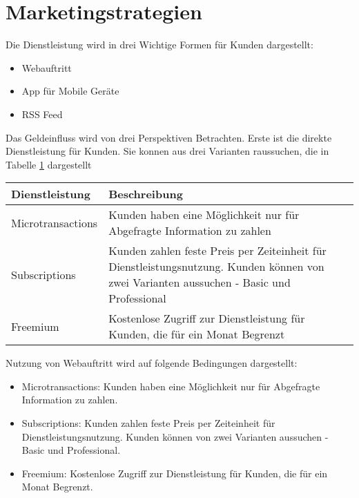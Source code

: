 \documentclass[12pt, a4paper]{article} %
\begin{document}
\newpage


\section{Marketingstrategien}

Die Dienstleistung wird in drei Wichtige Formen für Kunden dargestellt:
\begin{itemize}
\item Webauftritt
\item App für Mobile Geräte
\item RSS Feed
\end{itemize}

Das Geldeinfluss wird von drei Perspektiven Betrachten. Erste ist die direkte Dienstleistung für Kunden. Sie konnen aus drei Varianten raussuchen, die in Tabelle \ref{tab:kunden} dargestellt

\begin{table}[h]
  \centering
  \begin{tabular}{|l|l|}\hline
  Dienstleistung & Beschreibung \\ \hline
  Microtransactions & Kunden haben eine Möglichkeit nur für Abgefragte Information zu zahlen \\ \hline
  Subscriptions & Kunden zahlen feste Preis per Zeiteinheit für Dienstleistungsnutzung. Kunden können von zwei Varianten aussuchen - Basic und Professional \\ \hline
  Freemium & Kostenlose Zugriff zur Dienstleistung für Kunden, die für ein Monat Begrenzt \\ \hline
  \end{tabular}
  \label{tab:kunden}
\end{table}  

Nutzung von Webauftritt wird auf folgende Bedingungen dargestellt:
\begin{itemize}
\item Microtransactions: Kunden haben eine Möglichkeit nur für Abgefragte Information zu zahlen. 

\item Subscriptions: Kunden zahlen feste Preis per Zeiteinheit für Dienstleistungsnutzung. Kunden können von zwei Varianten aussuchen - Basic und Professional.

\item Freemium: Kostenlose Zugriff zur Dienstleistung für Kunden, die für ein Monat Begrenzt.
\end{itemize}
\end{document}
